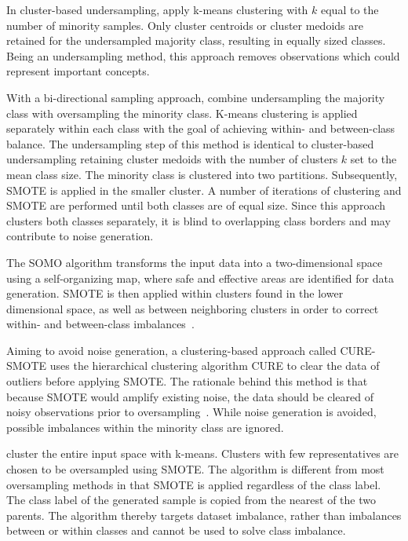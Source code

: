 \documentclass[sort&compress]{elsarticle}
\begin{document}
In cluster-based undersampling, \citet{Lin.2017} apply k-means clustering with
$k$ equal to the number of minority samples. Only cluster centroids or cluster
medoids are retained for the undersampled majority class, resulting in equally
sized classes. Being an undersampling method, this approach removes observations
which could represent important concepts.

With a bi-directional sampling approach, \citet{Song.2016} combine undersampling
the majority class with oversampling the minority class. K-means clustering is
applied separately within each class with the goal of achieving within- and
between-class balance. The undersampling step of this method is identical to
cluster-based undersampling \citep{Lin.2017} retaining cluster medoids with the
number of clusters $k$ set to the mean class size. The minority class is
clustered into two partitions. Subsequently, \ac{SMOTE} is applied in the
smaller cluster. A number of iterations of clustering and \ac{SMOTE} are
performed until both classes are of equal size. Since this approach clusters
both classes separately, it is blind to overlapping class borders and may
contribute to noise generation.

The \ac{SOMO} algorithm transforms the input data into a two-dimensional space
using a self-organizing map, where safe and effective areas are identified for
data generation. \ac{SMOTE} is then applied within clusters found in the lower
dimensional space, as well as between neighboring clusters in order to correct
within- and between-class imbalances~\citep{Douzas.2017}.

Aiming to avoid noise generation, a clustering-based approach called CURE-SMOTE
uses the hierarchical clustering algorithm CURE to clear the data of outliers
before applying \ac{SMOTE}. The rationale behind this method is that because
\ac{SMOTE} would amplify existing noise, the data should be cleared of noisy
observations prior to oversampling~\citep{Ma.2017}. While noise generation is
avoided, possible imbalances within the minority class are ignored.

\citet{Santos.2015} cluster the entire input space with k-means. Clusters with
few representatives are chosen to be oversampled using SMOTE. The algorithm is
different from most oversampling methods in that \ac{SMOTE} is applied
regardless of the class label. The class label of the generated sample is copied
from the nearest of the two parents. The algorithm thereby targets dataset
imbalance, rather than imbalances between or within classes and cannot be used
to solve class imbalance.
\end{document}
